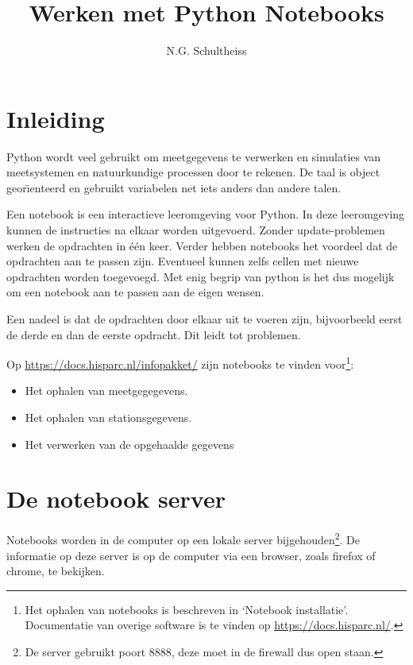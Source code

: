 

\title{Werken met Python Notebooks}
\author{N.G. Schultheiss}



\maketitle

\section{Inleiding}

Python wordt veel gebruikt om meetgegevens te verwerken en simulaties van meetsystemen en natuurkundige
processen door te rekenen. De taal is object geor\"\i enteerd en gebruikt variabelen net iets anders dan andere
talen.

Een notebook is een interactieve leeromgeving voor Python. In deze leeromgeving kunnen de instructies na elkaar worden
uitgevoerd. Zonder update-problemen werken de opdrachten in \'{e}\'{e}n keer. Verder hebben notebooks het voordeel
dat de opdrachten aan te passen zijn. Eventueel kunnen zelfs cellen met nieuwe opdrachten worden toegevoegd. Met
enig begrip van python is het dus mogelijk om een notebook aan te passen aan de eigen wensen.

Een nadeel is dat de opdrachten door elkaar uit te voeren zijn, bijvoorbeeld eerst de derde en dan de eerste opdracht. Dit leidt tot problemen.

Op \url{https://docs.hisparc.nl/infopakket/} zijn notebooks te vinden voor\footnote{Het ophalen van notebooks is beschreven in `Notebook installatie'. Documentatie van overige \hisparc software is te vinden op \url{https://docs.hisparc.nl/}.}:
\begin{itemize}
\item Het ophalen van meetgegegevens.
\item Het ophalen van stationsgegevens.
\item Het verwerken van de opgehaalde gegevens
\end{itemize}

\section{De notebook server}

Notebooks worden in de computer op een lokale server bijgehouden\footnote{De server gebruikt poort 8888, deze moet in de firewall dus open staan.}. De informatie op deze server is op de computer via een browser, zoals firefox of chrome, te bekijken.


